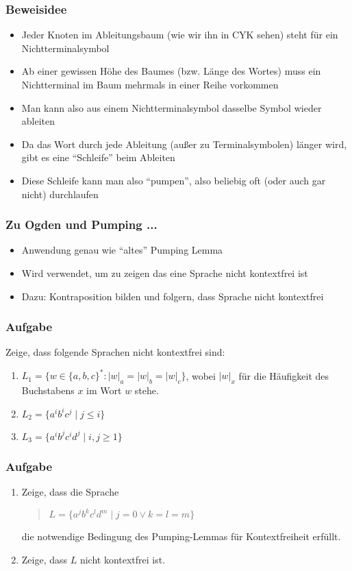 \begin{frame}
\frametitle{Beweisidee}
\begin{itemize}
\item Jeder Knoten im Ableitungsbaum (wie wir ihn in CYK sehen) steht für ein Nichtterminalsymbol
\item Ab einer gewissen Höhe des Baumes (bzw. Länge des Wortes) muss ein Nichtterminal im Baum mehrmals in einer Reihe vorkommen
\item Man kann also aus einem Nichtterminalsymbol dasselbe Symbol wieder ableiten
\item Da das Wort durch jede Ableitung (außer zu Terminalsymbolen) länger wird, gibt es eine "`Schleife"' beim Ableiten
\item Diese Schleife kann man also "`pumpen"', also beliebig oft (oder auch gar nicht) durchlaufen
\end{itemize}
\end{frame}

\begin{frame}
\frametitle{Zu Ogden und Pumping ...}
\begin{itemize}
\item Anwendung genau wie "`altes"' Pumping Lemma
\item Wird verwendet, um zu zeigen das eine Sprache nicht kontextfrei ist
\item Dazu: Kontraposition bilden und folgern, dass Sprache nicht kontextfrei
\end{itemize}
\end{frame}

\begin{frame}
\frametitle{Aufgabe}

Zeige, dass folgende Sprachen nicht kontextfrei sind:

\begin{enumerate}
  \item $L_1 = \{w \in \{a, b, c\}^*: |w|_a = |w|_b = |w|_c\}$,
	wobei $|w|_x$ für die Häufigkeit des
	Buchstabens $x$	im Wort $w$ stehe.
  \item $L_2 = \{a^ib^ic^j \mid j \leq i\}$
  \item $L_3=\{a^ib^jc^id^j \mid i,j \geq 1 \}$

\end{enumerate}
\end{frame}

\begin{frame}
\frametitle{Aufgabe}
\begin{enumerate}
  \item 
        Zeige, dass die Sprache
	\begin{quote}
	  $L = \{a^j b^k c^l d^m \mid j=0 \vee k=l=m\}$
	\end{quote}
	die notwendige Bedingung des Pumping-Lemmas für Kontextfreiheit
	erfüllt.
  \item Zeige, dass $L$ nicht kontextfrei ist.
\end{enumerate}
\end{frame}

